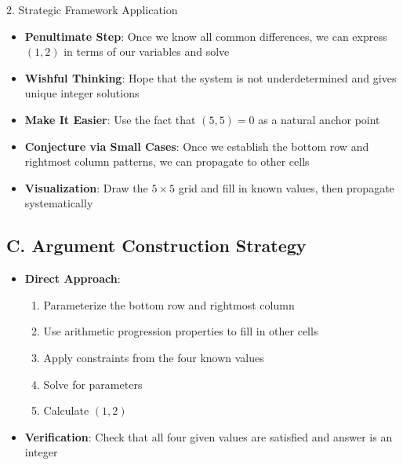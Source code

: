 \documentclass[12pt]{article}
\begin{document}
\begin{strategybox}{2. Strategic Framework Application}
\begin{itemize}[leftmargin=*]
    \item \textbf{Penultimate Step}: Once we know all common differences, we can express $(1,2)$ in terms of our variables and solve
    
    \item \textbf{Wishful Thinking}: Hope that the system is not underdetermined and gives unique integer solutions
    
    \item \textbf{Make It Easier}: Use the fact that $(5,5) = 0$ as a natural anchor point
    
    \item \textbf{Conjecture via Small Cases}: Once we establish the bottom row and rightmost column patterns, we can propagate to other cells
    
    \item \textbf{Visualization}: Draw the $5 \times 5$ grid and fill in known values, then propagate systematically
\end{itemize}

\subsection*{C. Argument Construction Strategy}
\begin{itemize}[leftmargin=*]
    \item \textbf{Direct Approach}: 
    \begin{enumerate}
        \item Parameterize the bottom row and rightmost column
        \item Use arithmetic progression properties to fill in other cells
        \item Apply constraints from the four known values
        \item Solve for parameters
        \item Calculate $(1,2)$
    \end{enumerate}
    
    \item \textbf{Verification}: Check that all four given values are satisfied and answer is an integer
\end{itemize}

\end{strategybox}
\end{document}
